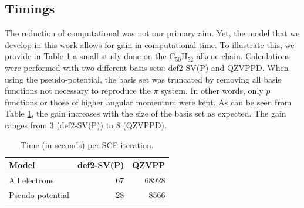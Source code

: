 \documentclass[aip]{revtex4-1}
\begin{document}
\subsection{Timings}
The reduction of computational was not our primary aim.
Yet, the model that we develop in this work allows for gain in computational time.
To illustrate this, we provide in Table \ref{tab:time} a small study done on the C$_{50}$H$_{52}$
alkene chain.
Calculations were performed with two different basis sets: def2-SV(P) and QZVPPD.
When using the pseudo-potential, the basis set was truncated by removing all
basis functions not necessary to reproduce the
$\pi$ system.
In other words, only $p$ functions or those of higher angular momentum were kept.
As can be seen from Table \ref{tab:time}, the gain increases
with the size of the basis set as expected.
The gain ranges from 3 (def2-SV(P)) to 8 (QZVPPD).

\begin{table}[ht]
\begin{tabular}{lrr}
\hline\hline
Model            & def2-SV(P) & QZVPP \\
\hline
All electrons    &        67 & 68928 \\
Pseudo-potential &        28 &  8566 \\
\hline\hline
\end{tabular}
\caption{\label{tab:time}Time (in seconds) per SCF iteration.} 
\end{table}
\end{document}
